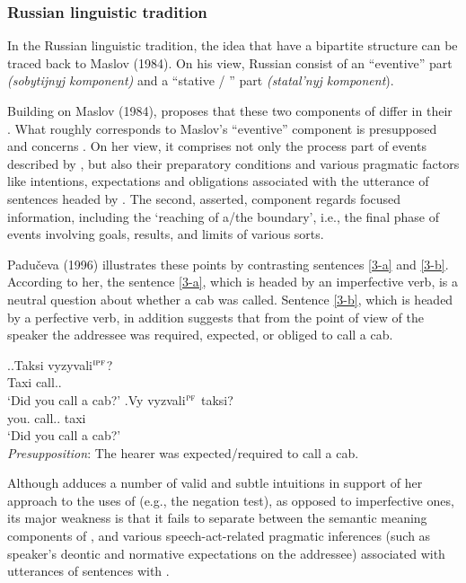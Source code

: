 \subsubsection{Russian linguistic tradition}
In the Russian linguistic tradition, the idea that  have a bipartite structure can be traced back to Maslov (1984). On his view, Russian  consist of an ``eventive'' part \textit{(sobytijnyj komponent)} and a ``stative / '' part \textit{(statal'nyj komponent}).

Building on Maslov (1984), \citet{Paducheva:96, Paducheva:11} proposes that these two components of  differ in their . What roughly corresponds to Maslov's ``eventive'' component is presupposed and concerns . On her view, it comprises not only the process part of events described by , but also their preparatory conditions and various pragmatic factors like intentions, expectations and obligations associated with the utterance of sentences headed by . The second, asserted, component regards focused information, including the `reaching of a/the boundary', i.e., the final phase of events involving goals, results, and limits of various sorts. 

Padu\v{c}eva (1996) illustrates these points by contrasting sentences \ref{3-a} and \ref{3-b}. According to her, the sentence \ref{3-a}, which is headed by an imperfective verb, is a neutral question about whether a cab was called. Sentence \ref{3-b}, which is headed by a perfective verb, in addition suggests that from the point of view of the speaker the addressee was required, expected, or obliged to call a cab. 

\ex.\label{3}\ag.\label{3-a}Taksi vyzyvali$^{\textsc{ipf}}$?\\
Taxi call..\\
\trans `Did you call a cab?'
\bg.\label{3-b}Vy vyzvali$^{\textsc{pf}}$ taksi?\\
you. call.. taxi\\
\trans `Did you call a cab?'\\
\textit{Presupposition}: The hearer was expected/required to call a cab.\\

Although \citet{Paducheva:96} adduces a number of valid and subtle intuitions in support of her approach to the uses of  (e.g., the negation test), as opposed to imperfective ones, its major weakness is that it fails to separate between the semantic meaning components of ,  and various speech-act-related pragmatic inferences (such as speaker's deontic and normative expectations on the addressee) associated with utterances of sentences with . 
 
